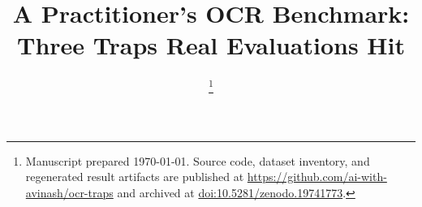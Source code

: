\documentclass[conference]{IEEEtran}
\begin{document}
\title{A Practitioner's OCR Benchmark:\\Three Traps Real Evaluations Hit}

\author{%
%
\thanks{Manuscript prepared \today. Source code, dataset inventory, and regenerated result artifacts are published at \url{https://github.com/ai-with-avinash/ocr-traps} and archived at \href{https://doi.org/10.5281/zenodo.19741773}{doi:10.5281/zenodo.19741773}.}%
}

\maketitle
\end{document}
